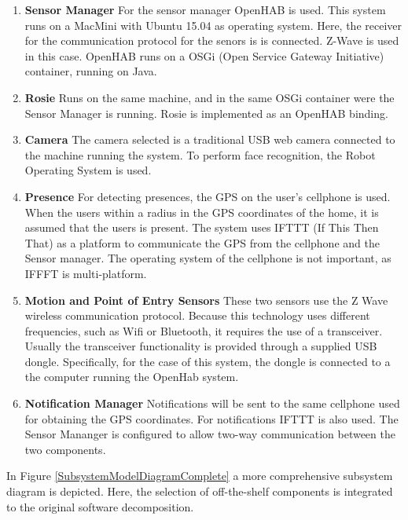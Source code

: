 \begin{enumerate}
	\item \textbf{Sensor Manager} For the sensor manager OpenHAB is used. This system runs on a MacMini with Ubuntu 15.04 as operating system. Here, the receiver for the communication protocol for the senors is is connected. Z-Wave is used in this case. OpenHAB runs on a OSGi (Open Service Gateway Initiative) container, running on Java.
	\item \textbf{Rosie} Runs on the same machine, and in the same OSGi container were the Sensor Manager is running. Rosie is implemented as an OpenHAB binding.
	\item \textbf{Camera} The camera selected is a traditional USB web camera connected to the machine running the system. To perform face recognition, the Robot Operating System is used.
	\item \textbf{Presence} For detecting presences, the GPS on the user's cellphone is used. When the users within a radius in the GPS coordinates of the home, it is assumed that the users is present. The system uses IFTTT (If This Then That) as a platform to communicate the GPS from the cellphone and the Sensor manager. The operating system of the cellphone is not important, as IFFFT is multi-platform.
	\item \textbf{Motion and Point of Entry Sensors} These two sensors use the Z Wave wireless communication protocol. Because this technology uses different frequencies, such as Wifi or Bluetooth, it requires the use of a transceiver. Usually the transceiver functionality is provided through a supplied USB dongle. Specifically, for the case of this system, the dongle is connected to a the computer running the OpenHab system.
	\item \textbf{Notification Manager} Notifications will be sent to the same cellphone used for obtaining the GPS coordinates. For notifications IFTTT is also used. The Sensor Mananger is configured to allow two-way communication between the two components. 
\end{enumerate}


In Figure \ref{SubsystemModelDiagramComplete} a more comprehensive subsystem diagram is depicted. Here, the selection of off-the-shelf components is integrated to the original software decomposition.


